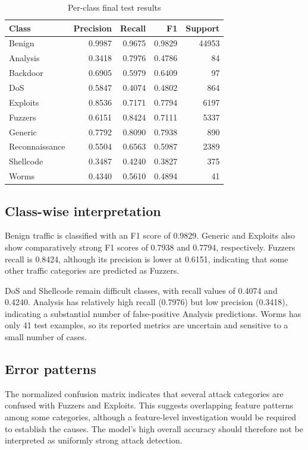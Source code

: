\documentclass[conference]{IEEEtran}
\begin{document}
\begin{table}[t]
\caption{Per-class final test results}
\label{tab:perclass}
\centering
\footnotesize
\begin{tabular}{lrrrr}
\toprule
Class & Precision & Recall & F1 & Support\\
\midrule
Benign & 0.9987 & 0.9675 & 0.9829 & 44953\\
Analysis & 0.3418 & 0.7976 & 0.4786 & 84\\
Backdoor & 0.6905 & 0.5979 & 0.6409 & 97\\
DoS & 0.5847 & 0.4074 & 0.4802 & 864\\
Exploits & 0.8536 & 0.7171 & 0.7794 & 6197\\
Fuzzers & 0.6151 & 0.8424 & 0.7111 & 5337\\
Generic & 0.7792 & 0.8090 & 0.7938 & 890\\
Reconnaissance & 0.5504 & 0.6563 & 0.5987 & 2389\\
Shellcode & 0.3487 & 0.4240 & 0.3827 & 375\\
Worms & 0.4340 & 0.5610 & 0.4894 & 41\\
\bottomrule
\end{tabular}
\end{table}

\subsection{Class-wise interpretation}
Benign traffic is classified with an F1 score of 0.9829. Generic and Exploits also show comparatively strong F1 scores of 0.7938 and 0.7794, respectively. Fuzzers recall is 0.8424, although its precision is lower at 0.6151, indicating that some other traffic categories are predicted as Fuzzers.

DoS and Shellcode remain difficult classes, with recall values of 0.4074 and 0.4240. Analysis has relatively high recall (0.7976) but low precision (0.3418), indicating a substantial number of false-positive Analysis predictions. Worms has only 41 test examples, so its reported metrics are uncertain and sensitive to a small number of cases.

\subsection{Error patterns}
The normalized confusion matrix indicates that several attack categories are confused with Fuzzers and Exploits. This suggests overlapping feature patterns among some categories, although a feature-level investigation would be required to establish the causes. The model's high overall accuracy should therefore not be interpreted as uniformly strong attack detection.
\end{document}
